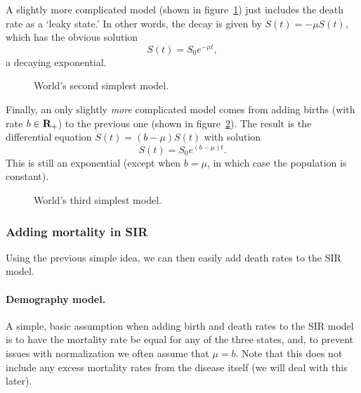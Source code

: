 \documentclass[12pt]{article}
\begin{document}
A slightly more complicated model (shown in
figure~\ref{fig:simple-model-deaths}) just includes the death rate as a `leaky
state.' In other words, the decay is given by $\dot S(t) = -\mu S(t)$, which has
the obvious solution
\[
    S(t) = S_0e^{-\mu t},
\]
a decaying exponential.

\begin{figure}[ht!]
\centering
{}
\caption{World's second simplest model.}
\label{fig:simple-model-deaths}
\end{figure}

Finally, an only slightly \emph{more} complicated model comes from adding
births (with rate $b \in {\mbox{\bf R}}_+$) to the previous one (shown in
figure~\ref{fig:simple-model-births}). The result is the differential equation
$\dot S(t) = (b - \mu)S(t)$ with solution
\[
    S(t) = S_0e^{(b - \mu)t}.
\]
This is still an exponential (except when $b = \mu$, in which case the
population is constant).

\begin{figure}[ht!]
\centering
{}
\caption{World's third simplest model.}
\label{fig:simple-model-births}
\end{figure}

\subsubsection{Adding mortality in SIR}
Using the previous simple idea, we can then easily add death rates to the SIR
model.

\paragraph{Demography model.} A simple, basic assumption when adding birth
and death rates to the SIR model is to have the mortality rate be equal
for any of the three states, and, to prevent issues with normalization
we often assume that $\mu = b$. Note that this does
not include any excess mortality rates from the disease itself (we will deal
with this later). 
\end{document}
